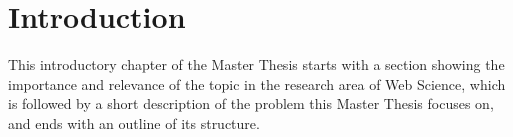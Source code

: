 
\chapter{Introduction} %
\label{cha:introduction}

This introductory chapter of the Master Thesis starts with a section showing the importance and relevance of the topic in the research area of Web Science, which is followed by a short description of the problem this Master Thesis focuses on, and ends with an outline of its structure.








